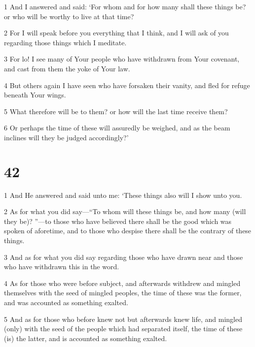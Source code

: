 \par 1 And I answered and said: ‘For whom and for how many shall these things be? or who will be worthy to live at that time? 

\par 2 For I will speak before you everything that I think, and I will ask of you regarding those things which I meditate. 

\par 3 For lo! I see many of Your people who have withdrawn from Your covenant, and cast from them the yoke of Your law. 

\par 4 But others again I have seen who have forsaken their vanity, and fled for refuge beneath Your wings. 

\par 5 What therefore will be to them? or how will the last time receive them? 

\par 6 Or perhaps the time of these will assuredly be weighed, and as the beam inclines will they be judged accordingly?’

\chapter{42}

\par 1 And He answered and said unto me: ‘These things also will I show unto you. 

\par 2 As for what you did say—“To whom will these things be, and how many (will they be)? ”—to those who have believed there shall be the good which was spoken of aforetime, and to those who despise there shall be the contrary of these things. 

\par 3 And as for what you did say regarding those who have drawn near and those who have withdrawn this in the word. 

\par 4 As for those who were before subject, and afterwards withdrew and mingled themselves with the seed of mingled peoples, the time of these was the former, and was accounted as something exalted. 

\par 5 And as for those who before knew not but afterwards knew life, and mingled (only) with the seed of the people which had separated itself, the time of these (is) the latter, and is accounted as something exalted. 

